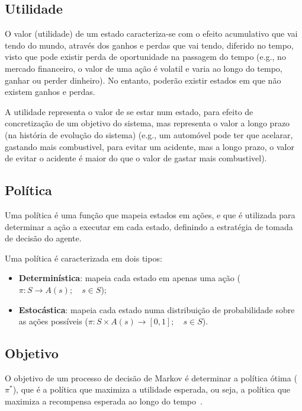 \subsection{Utilidade}\label{subsec:utilidade}

O valor (utilidade) de um estado caracteriza-se com o efeito acumulativo que vai tendo do mundo, através dos ganhos e perdas que vai tendo, diferido no tempo, visto que pode existir perda de oportunidade na passagem do tempo (e.g., no mercado financeiro, o valor de uma ação é volatil e varia ao longo do tempo, ganhar ou perder dinheiro).
No entanto, poderão existir estados em que não existem ganhos e perdas.

A utilidade representa o valor de se estar num estado, para efeito de concretização de um objetivo do sistema, mas representa o valor a longo prazo (na história de evolução do sistema) (e.g., um automóvel pode ter que acelarar, gastando mais combustivel, para evitar um acidente, mas a longo prazo, o valor de evitar o acidente é maior do que o valor de gastar mais combustivel).


\subsection{Política}\label{subsec:politica-otima}

Uma política é uma função que mapeia estados em ações, e que é utilizada para determinar a ação a executar em cada estado, definindo a estratégia de tomada de decisão do agente.

Uma política é caracterizada em dois tipos:

\begin{itemize}
    \item \textbf{Determinística}: mapeia cada estado em apenas uma ação ($\pi : S \rightarrow A(s); \quad s \in S$);
    \item \textbf{Estocástica}: mapeia cada estado numa distribuição de probabilidade sobre as ações possíveis ($\pi : S \times A(s) \rightarrow [0,1]; \quad s \in S$).
\end{itemize}


\subsection{Objetivo}\label{subsec:objetivo}

O objetivo de um processo de decisão de Markov é determinar a política ótima ($\pi^*$), que é a política que maximiza a utilidade esperada, ou seja, a política que maximiza a recompensa esperada ao longo do tempo~\cite{isel:iasa:slides:processos-decisao-sequencial}.

